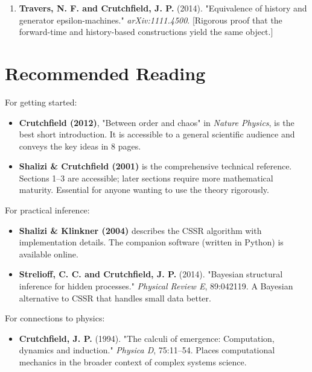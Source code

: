 \begin{enumerate}
\item \textbf{Travers, N. F. and Crutchfield, J. P.} (2014). "Equivalence of history and generator epsilon-machines." \textit{arXiv:1111.4500}. [Rigorous proof that the forward-time and history-based constructions yield the same object.]
\end{enumerate}



\section{Recommended Reading}

For getting started:

\begin{itemize}
\item \textbf{Crutchfield (2012)}, "Between order and chaos" in \textit{Nature Physics}, is the best short introduction. It is accessible to a general scientific audience and conveys the key ideas in 8 pages.
\end{itemize}

\begin{itemize}
\item \textbf{Shalizi \& Crutchfield (2001)} is the comprehensive technical reference. Sections 1--3 are accessible; later sections require more mathematical maturity. Essential for anyone wanting to use the theory rigorously.
\end{itemize}

For practical inference:

\begin{itemize}
\item \textbf{Shalizi \& Klinkner (2004)} describes the CSSR algorithm with implementation details. The companion software (written in Python) is available online.
\end{itemize}

\begin{itemize}
\item \textbf{Strelioff, C. C. and Crutchfield, J. P.} (2014). "Bayesian structural inference for hidden processes." \textit{Physical Review E}, 89:042119. A Bayesian alternative to CSSR that handles small data better.
\end{itemize}

For connections to physics:

\begin{itemize}
\item \textbf{Crutchfield, J. P.} (1994). "The calculi of emergence: Computation, dynamics and induction." \textit{Physica D}, 75:11--54. Places computational mechanics in the broader context of complex systems science.
\end{itemize}

